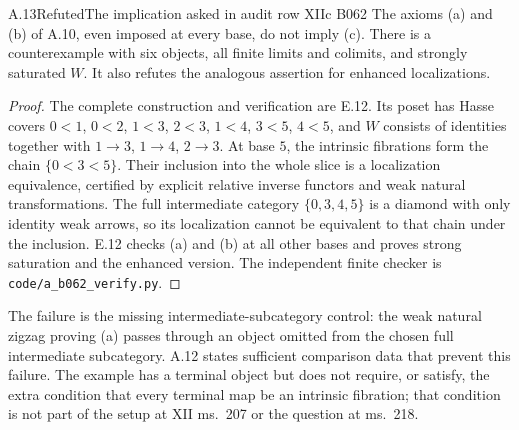 \begin{claim}{A.13}{Refuted}{The implication asked in audit row XIIc B062}
The axioms (a) and (b) of A.10, even imposed at every base, do not imply (c). There is a counterexample with six objects, all finite limits and colimits, and strongly saturated $W$. It also refutes the analogous assertion for enhanced localizations.
\end{claim}
\begin{proof}
The complete construction and verification are E.12. Its poset has Hasse covers $0<1$, $0<2$, $1<3$, $2<3$, $1<4$, $3<5$, $4<5$, and $W$ consists of identities together with $1\to3$, $1\to4$, $2\to3$. At base $5$, the intrinsic fibrations form the chain $\{0<3<5\}$. Their inclusion into the whole slice is a localization equivalence, certified by explicit relative inverse functors and weak natural transformations. The full intermediate category $\{0,3,4,5\}$ is a diamond with only identity weak arrows, so its localization cannot be equivalent to that chain under the inclusion. E.12 checks (a) and (b) at all other bases and proves strong saturation and the enhanced version. The independent finite checker is \texttt{code/a\_b062\_verify.py}.
\end{proof}
The failure is the missing intermediate-subcategory control: the weak natural zigzag proving (a) passes through an object omitted from the chosen full intermediate subcategory. A.12 states sufficient comparison data that prevent this failure. The example has a terminal object but does not require, or satisfy, the extra condition that every terminal map be an intrinsic fibration; that condition is not part of the setup at XII ms.~207 or the question at ms.~218.

